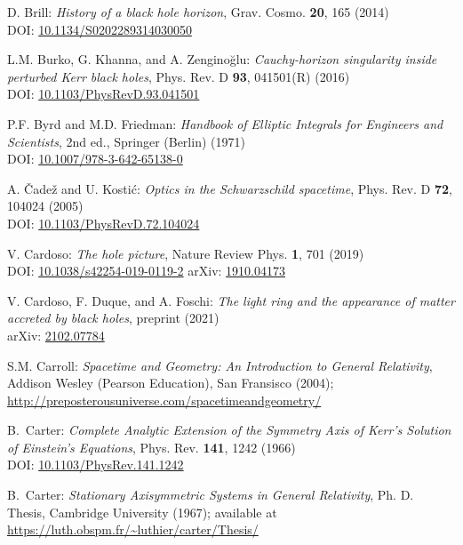 \begin{thebibliography}{123}
D. Brill: {\em History of a black hole horizon},
Grav. Cosmo. {\bf 20}, 165 (2014) \\
DOI: \href{https://doi.org/10.1134/S0202289314030050}{10.1134/S0202289314030050}

L.M. Burko, G. Khanna, and A. Zenginoğlu: {\em
Cauchy-horizon singularity inside perturbed Kerr black holes},
Phys. Rev. D {\bf 93}, 041501(R) (2016) \\
DOI: \href{https://doi.org/10.1103/PhysRevD.93.041501}{10.1103/PhysRevD.93.041501}

P.F. Byrd and M.D. Friedman:
{\em Handbook of Elliptic Integrals for Engineers and Scientists},
2nd ed., Springer (Berlin) (1971)\\
DOI: \href{https://doi.org/10.1007/978-3-642-65138-0}{10.1007/978-3-642-65138-0}

A. \v{C}ade\v{z} and U. Kosti\'c:
{\em Optics in the Schwarzschild spacetime},
Phys. Rev. D {\bf 72}, 104024 (2005)\\
DOI: \href{https://doi.org/10.1103/PhysRevD.72.104024}{10.1103/PhysRevD.72.104024}

V. Cardoso:
{\em The hole picture},
Nature Review Phys. {\bf 1}, 701 (2019)\\
DOI: \href{https://doi.org/10.1038/s42254-019-0119-2}{10.1038/s42254-019-0119-2}\hfill
arXiv: \href{https://arxiv.org/abs/1910.04173}{1910.04173}

V. Cardoso, F. Duque, and A. Foschi:
{\em The light ring and the appearance of matter accreted by black holes},
preprint (2021)\\
arXiv: \href{https://arxiv.org/abs/2102.07784}{2102.07784}

S.M. Carroll: \emph{Spacetime and Geometry: An Introduction to General Relativity},
Addison Wesley (Pearson Education), San Fransisco (2004); \\
\url{http://preposterousuniverse.com/spacetimeandgeometry/}

B.~Carter:
{\em Complete Analytic Extension of the Symmetry Axis of Kerr's Solution of Einstein's Equations},
Phys. Rev. {\bf 141}, 1242 (1966)\\
DOI: \href{https://doi.org/10.1103/PhysRev.141.1242}{10.1103/PhysRev.141.1242}

B.~Carter: {\em Stationary Axisymmetric Systems in General Relativity},
Ph. D. Thesis, Cambridge University (1967); available at\\
\url{https://luth.obspm.fr/~luthier/carter/Thesis/}


\end{thebibliography}
